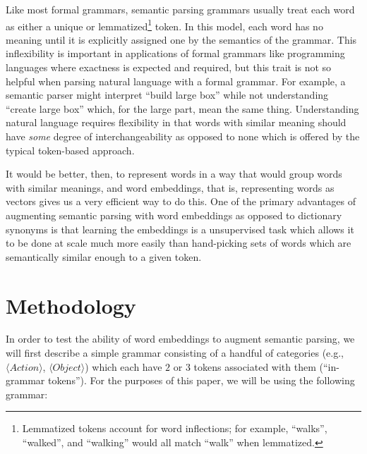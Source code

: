 \documentclass[a4paper]{article}
\begin{document}
Like most formal grammars, semantic parsing grammars usually treat each word
as either a unique or lemmatized\footnote{Lemmatized tokens account for word
inflections; for example, ``walks'', ``walked'', and ``walking'' would all
match ``walk'' when lemmatized.} token.
In this model, each word has no meaning until it is explicitly assigned one
by the semantics of the grammar.
This inflexibility is important in applications of formal grammars like
programming
languages where exactness is expected and required, but this trait is not so
helpful when parsing natural language with a formal grammar.
For example, a semantic parser might interpret ``build large box'' while not
understanding ``create large box'' which, for the large part, mean the same thing.
Understanding natural language requires flexibility in that words with
similar meaning should have \textit{some} degree of interchangeability as
opposed to none which is offered by the typical token-based approach.

It would be better, then, to represent words in a way that would group words
with similar meanings, and word embeddings, that is, representing words as
vectors gives us a very efficient way to do this.
One of the primary advantages of augmenting semantic parsing with word
embeddings as opposed to dictionary synonyms is that learning the embeddings
is a unsupervised task which allows it to be done at scale much more easily than
hand-picking sets of words which are semantically similar enough to a given
token.

\section{Methodology}

In order to test the ability of word embeddings to augment semantic parsing,
we will first describe a simple grammar consisting of a handful of categories
(e.g., $\langle Action \rangle$, $\langle Object \rangle$) which each have
$2$ or $3$ tokens associated with them (``in-grammar tokens'').
For the purposes of this paper, we will be using the following grammar:
\end{document}
